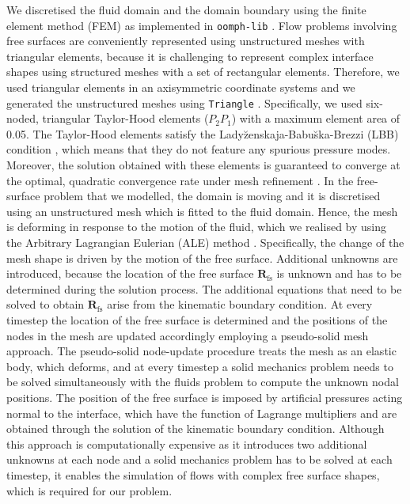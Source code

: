 \documentclass[aip,graphicx]{revtex4-1}
\newcommand{\sym}[1]{\text{#1}}
\newcommand{\vect}[1]{\bm{#1}}
\begin{document}
We discretised the fluid domain and the domain boundary using the finite element method (FEM) as implemented in \texttt{oomph-lib} \cite{HeilHazelOomph2006}.
Flow problems involving free surfaces are conveniently represented using unstructured meshes with triangular elements, because it is challenging to represent complex interface shapes using structured meshes with a set of rectangular elements.
Therefore, we used triangular elements in an axisymmetric coordinate systems and we generated the unstructured meshes using \texttt{Triangle} \cite{shewchuk96b}.
Specifically, we used six-noded, triangular Taylor-Hood \cite{taylor1973numerical} elements ($P_2 P_1$) with a maximum element area of 0.05.
The Taylor-Hood elements satisfy the Lady\u{z}enskaja-Babu\u{s}ka-Brezzi (LBB) condition \cite{sani2000incompressible}, which means that they do not feature any spurious pressure modes.
Moreover, the solution obtained with these elements is guaranteed to converge at the optimal, quadratic convergence rate under mesh refinement \cite{donea2003finite}.
In the free-surface problem that we modelled, the domain is moving and it is discretised using an unstructured mesh which is fitted to the fluid domain. 
Hence, the mesh is deforming in response to the motion of the fluid, which we realised by using the Arbitrary Lagrangian Eulerian (ALE) method \cite{donea1982arbitrary}.
Specifically, the change of the mesh shape is driven by the motion of the free surface.
Additional unknowns are introduced, because the location of the free surface $\vect{R}_{\sym{fs}}$ is unknown and has to be determined during the solution process.
The additional equations that need to be solved to obtain $\vect{R}_{\sym{fs}}$ arise from the kinematic boundary condition.
At every timestep the location of the free surface is determined and the positions of the nodes in the mesh are updated accordingly employing a pseudo-solid mesh approach.
The pseudo-solid node-update procedure treats the mesh as an elastic body, which deforms, and at every timestep a solid mechanics problem needs to be solved simultaneously with the fluids problem to compute the unknown nodal positions.
The position of the free surface is imposed by artificial pressures acting normal to the interface, which have the function of Lagrange multipliers and are obtained through the solution of the kinematic boundary condition.
Although this approach is computationally expensive as it introduces two additional unknowns at each node and a solid mechanics problem has to be solved at each timestep, it enables the simulation of flows with complex free surface shapes, which is required for our problem.
\end{document}
